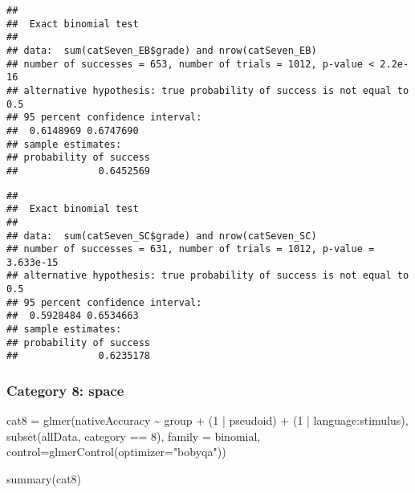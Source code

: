 \documentclass[
]{article}
\newenvironment{Shaded}{\begin{snugshade}}{\end{snugshade}}
\newcommand{\AttributeTok}[1]{\textcolor[rgb]{0.77,0.63,0.00}{#1}}
\newcommand{\DecValTok}[1]{\textcolor[rgb]{0.00,0.00,0.81}{#1}}
\newcommand{\FunctionTok}[1]{\textcolor[rgb]{0.00,0.00,0.00}{#1}}
\newcommand{\NormalTok}[1]{#1}
\newcommand{\OtherTok}[1]{\textcolor[rgb]{0.56,0.35,0.01}{#1}}
\newcommand{\SpecialCharTok}[1]{\textcolor[rgb]{0.00,0.00,0.00}{#1}}
\newcommand{\StringTok}[1]{\textcolor[rgb]{0.31,0.60,0.02}{#1}}
\begin{document}
\begin{verbatim}
## 
##  Exact binomial test
## 
## data:  sum(catSeven_EB$grade) and nrow(catSeven_EB)
## number of successes = 653, number of trials = 1012, p-value < 2.2e-16
## alternative hypothesis: true probability of success is not equal to 0.5
## 95 percent confidence interval:
##  0.6148969 0.6747690
## sample estimates:
## probability of success 
##              0.6452569
\end{verbatim}

\begin{Shaded}
\end{Shaded}

\begin{verbatim}
## 
##  Exact binomial test
## 
## data:  sum(catSeven_SC$grade) and nrow(catSeven_SC)
## number of successes = 631, number of trials = 1012, p-value = 3.633e-15
## alternative hypothesis: true probability of success is not equal to 0.5
## 95 percent confidence interval:
##  0.5928484 0.6534663
## sample estimates:
## probability of success 
##              0.6235178
\end{verbatim}

\hypertarget{category-8-space}{%
\subsubsection{Category 8: space}\label{category-8-space}}

\begin{Shaded}
\begin{Highlighting}[]
\NormalTok{cat8 }\OtherTok{=} \FunctionTok{glmer}\NormalTok{(nativeAccuracy }\SpecialCharTok{\textasciitilde{}}\NormalTok{ group }\SpecialCharTok{+}
\NormalTok{        (}\DecValTok{1} \SpecialCharTok{|}\NormalTok{ pseudoid) }\SpecialCharTok{+}\NormalTok{ (}\DecValTok{1} \SpecialCharTok{|}\NormalTok{ language}\SpecialCharTok{:}\NormalTok{stimulus),}
      \FunctionTok{subset}\NormalTok{(allData, category }\SpecialCharTok{==} \DecValTok{8}\NormalTok{),}
      \AttributeTok{family =}\NormalTok{ binomial,}
      \AttributeTok{control=}\FunctionTok{glmerControl}\NormalTok{(}\AttributeTok{optimizer=}\StringTok{"bobyqa"}\NormalTok{))}

\FunctionTok{summary}\NormalTok{(cat8)}
\end{Highlighting}
\end{Shaded}
\end{document}
